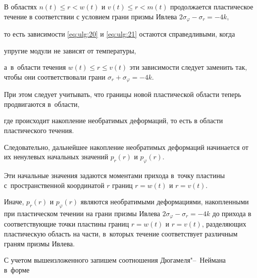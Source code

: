 В областях $n(t)\le r<w(t)$ и $ v(t)\le r<m(t)$ продолжается пластическое  течение в соответствии с условием грани призмы Ивлева $2\sigma _{\varphi } -\sigma _{r} =-4k$,  

то есть зависимости \eqref{eq:ulg:20} и \eqref{eq:ulg:21} остаются справедливыми, когда 

упругие модули не зависят от температуры, 

а~в~области течения $w(t)\le r\le v(t)$ эти зависимости следует заменить так, чтобы они соответствовали грани $\sigma _{r} +\sigma _{\varphi } =-4k$. 

При этом следует учитывать, что границы новой пластической области теперь продвигаются в~области, 

где происходит накопление необратимых деформаций, то есть в области пластического течения. 

Следовательно, дальнейшее накопление необратимых деформаций начинается от их ненулевых начальных значений $p_{r} (r)$  и $p_{\varphi } (r)$.  

Эти начальные значения задаются моментами прихода в~точку пластины с~пространственной координатой  $r$ границ $r=w(t)$ и $r=v(t)$. 

Иначе, $p_{r} (r)$  и $p_{\varphi } (r)$ являются необратимыми деформациями, накопленными при пластическом течении на грани призмы Ивлева $2\sigma _{\varphi } -\sigma _{r} =-4k$ до прихода в соответствующие точки пластины границ $r=w(t)$ и $r=v(t)$, разделяющих пластическую область на части, в~которых течение соответствует различным граням призмы Ивлева.  



С учетом вышеизложенного запишем соотношения Дюгамеля"--~Неймана в~форме

